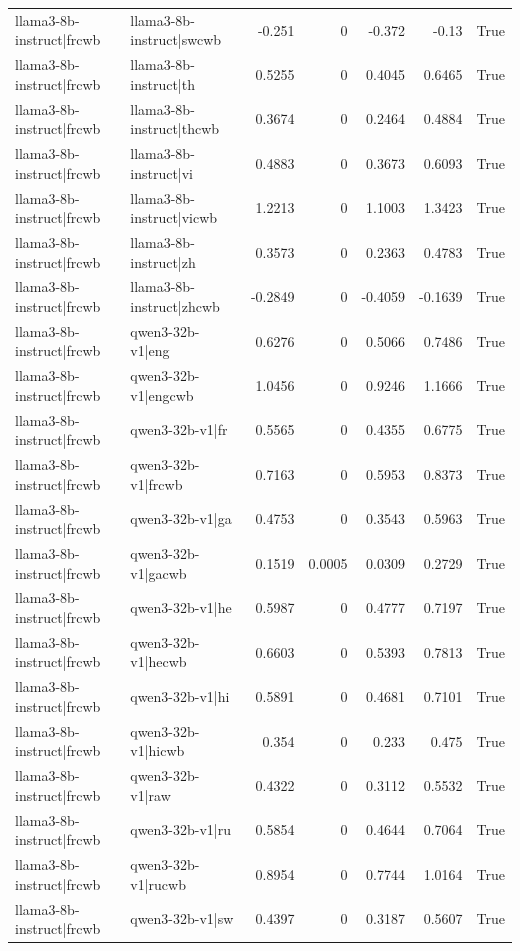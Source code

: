 \begin{table}
\begin{tabular}{l l r r r r l}
llama3-8b-instruct|frcwb & llama3-8b-instruct|swcwb & -0.251 & 0 & -0.372 & -0.13 & True \\
llama3-8b-instruct|frcwb & llama3-8b-instruct|th & 0.5255 & 0 & 0.4045 & 0.6465 & True \\
llama3-8b-instruct|frcwb & llama3-8b-instruct|thcwb & 0.3674 & 0 & 0.2464 & 0.4884 & True \\
llama3-8b-instruct|frcwb & llama3-8b-instruct|vi & 0.4883 & 0 & 0.3673 & 0.6093 & True \\
llama3-8b-instruct|frcwb & llama3-8b-instruct|vicwb & 1.2213 & 0 & 1.1003 & 1.3423 & True \\
llama3-8b-instruct|frcwb & llama3-8b-instruct|zh & 0.3573 & 0 & 0.2363 & 0.4783 & True \\
llama3-8b-instruct|frcwb & llama3-8b-instruct|zhcwb & -0.2849 & 0 & -0.4059 & -0.1639 & True \\
llama3-8b-instruct|frcwb & qwen3-32b-v1|eng & 0.6276 & 0 & 0.5066 & 0.7486 & True \\
llama3-8b-instruct|frcwb & qwen3-32b-v1|engcwb & 1.0456 & 0 & 0.9246 & 1.1666 & True \\
llama3-8b-instruct|frcwb & qwen3-32b-v1|fr & 0.5565 & 0 & 0.4355 & 0.6775 & True \\
llama3-8b-instruct|frcwb & qwen3-32b-v1|frcwb & 0.7163 & 0 & 0.5953 & 0.8373 & True \\
llama3-8b-instruct|frcwb & qwen3-32b-v1|ga & 0.4753 & 0 & 0.3543 & 0.5963 & True \\
llama3-8b-instruct|frcwb & qwen3-32b-v1|gacwb & 0.1519 & 0.0005 & 0.0309 & 0.2729 & True \\
llama3-8b-instruct|frcwb & qwen3-32b-v1|he & 0.5987 & 0 & 0.4777 & 0.7197 & True \\
llama3-8b-instruct|frcwb & qwen3-32b-v1|hecwb & 0.6603 & 0 & 0.5393 & 0.7813 & True \\
llama3-8b-instruct|frcwb & qwen3-32b-v1|hi & 0.5891 & 0 & 0.4681 & 0.7101 & True \\
llama3-8b-instruct|frcwb & qwen3-32b-v1|hicwb & 0.354 & 0 & 0.233 & 0.475 & True \\
llama3-8b-instruct|frcwb & qwen3-32b-v1|raw & 0.4322 & 0 & 0.3112 & 0.5532 & True \\
llama3-8b-instruct|frcwb & qwen3-32b-v1|ru & 0.5854 & 0 & 0.4644 & 0.7064 & True \\
llama3-8b-instruct|frcwb & qwen3-32b-v1|rucwb & 0.8954 & 0 & 0.7744 & 1.0164 & True \\
llama3-8b-instruct|frcwb & qwen3-32b-v1|sw & 0.4397 & 0 & 0.3187 & 0.5607 & True \\

\end{tabular}
\end{table}
